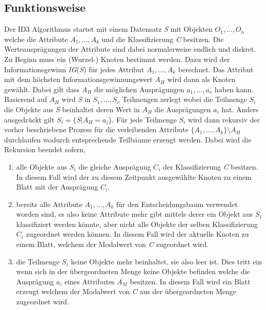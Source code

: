 \subsection{Funktionsweise}
Der ID3 Algorithmus startet mit einem Datensatz \textit{S} mit Objekten $O_{1},...,O_{n}$ welche die Attribute $A_{1},...,A_{k}$ und die Klassifizierung \textit{C} besitzen. \autocites{ImplementationID3}{QuinlanID3} Die Werteausprägungen der Attribute sind dabei normalerweise endlich und diskret. \autocite{ThailandID3}\\
Zu Beginn muss ein (Wurzel-) Knoten bestimmt werden. Dazu wird der Informationsgewinn \textit{IG}(\textit{S}) für jedes Attribut $A_{1},...,A_{k}$ berechnet. Das Attribut mit dem höchsten Informationsgewinnungswert $A_{H}$ wird dann als Knoten gewählt. Dabei gilt dass $A_{H}$ die möglichen Ausprägungen $a_{1},...,a_{v}$ haben kann. Basierend auf $A_{H}$ wird \textit{S} in $S_{1},...,S_{v}$ Teilmengen zerlegt wobei die Teilmenge $S_{i}$ die Objekte aus \textit{S} beinhaltet deren Wert in $A_{H}$ die Ausprägungen $a_{i}$ hat. Anders ausgedrückt gilt $S_{i} = \{S\vert A_{H} = a_{i}\}$. Für jede Teilmenge $S_{i}$ wird dann rekursiv der vorher beschriebene Prozess für die verleibenden Attribute $\{A_{1},...,A_{k}\}\setminus A_{H}$ durchlaufen wodurch entsprechende Teilbäume erzeugt werden. \Autocite{QuinlanID3} Dabei wird die Rekursion beendet sofern,

\begin{enumerate}
    \item alle Objekte aus $S_{i}$ die gleiche Ausprägung $C_{i}$ der Klassifizierung \textit{C} besitzen. In diesem Fall wird der zu diesem Zeitpunkt ausgewählte Knoten zu einem Blatt mit der Ausprägung $C_{i}$. \autocites{QuinlanID3}{ID3algor15:online}
    \item bereits alle Attribute $A_{1},...,A_{k}$ für den Entscheidungsbaum verwendet worden sind, es also keine Attribute mehr gibt mittels derer ein Objekt aus $S_{i}$ klassifiziert werden könnte, aber nicht alle Objekte der selben Klassifizierung $C_{i}$ zugeordnet werden können. In diesem Fall wird der aktuelle Knoten zu einem Blatt, welchem der Modalwert von \textit{C} zugeordnet wird.\autocites{QuinlanID3}{ID3algor15:online}
    \item die Teilmenge $S_{i}$ keine Objekte mehr beinhaltet, sie also leer ist. Dies tritt ein wenn sich in der übergeordneten Menge keine Objekte befinden welche die Ausprägung $a_{i}$ eines Attributes $A_{M}$ besitzen. In diesem Fall wird ein Blatt erzeugt welchem der Modalwert von \textit{C} aus der übergeordneten Menge zugeordnet wird. \autocite{ID3algor15:online}
\end{enumerate}

\pagebreak